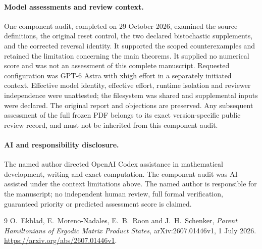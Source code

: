 \documentclass[11pt,a4paper]{article}
\begin{document}
\paragraph{Model assessments and review context.}
One component audit, completed on 29 October 2026, examined the source definitions, the original reset control, the two declared bistochastic supplements, and the corrected reversal identity. It supported the scoped counterexamples and retained the limitation concerning the main theorems. It supplied no numerical score and was not an assessment of this complete manuscript. Requested configuration was GPT-6 Astra with xhigh effort in a separately initiated context. Effective model identity, effective effort, runtime isolation and reviewer independence were unattested; the filesystem was shared and supplemental inputs were declared. The original report and objections are preserved. Any subsequent assessment of the full frozen PDF belongs to its exact version-specific public review record, and must not be inherited from this component audit.

\paragraph{AI and responsibility disclosure.}
The named author directed OpenAI Codex assistance in mathematical development, writing and exact computation. The component audit was AI-assisted under the context limitations above. The named author is responsible for the manuscript; no independent human review, full formal verification, guaranteed priority or predicted assessment score is claimed.

\begin{thebibliography}{9}
O.~Ekblad, E.~Moreno-Nadales, E.~B.~Roon and J.~H.~Schenker,
\emph{Parent Hamiltonians of Ergodic Matrix Product States},
arXiv:2607.01446v1, 1 July 2026.
\url{https://arxiv.org/abs/2607.01446v1}.
\end{thebibliography}
\end{document}
